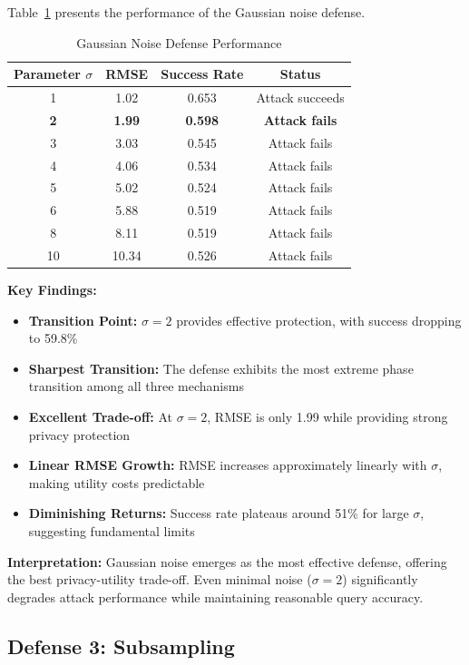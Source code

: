 \documentclass[11pt,letterpaper]{article}
\begin{document}
Table~\ref{tab:noise} presents the performance of the Gaussian noise defense.

\begin{table}[H]
\centering
\caption{Gaussian Noise Defense Performance}
\label{tab:noise}
\begin{tabular}{@{}cccc@{}}
\toprule
\textbf{Parameter $\sigma$} & \textbf{RMSE} & \textbf{Success Rate} & \textbf{Status} \\ \midrule
1 & 1.02 & 0.653 & Attack succeeds \\
\textbf{2} & \textbf{1.99} & \textbf{0.598} & \textbf{Attack fails} \\
3 & 3.03 & 0.545 & Attack fails \\
4 & 4.06 & 0.534 & Attack fails \\
5 & 5.02 & 0.524 & Attack fails \\
6 & 5.88 & 0.519 & Attack fails \\
8 & 8.11 & 0.519 & Attack fails \\
10 & 10.34 & 0.526 & Attack fails \\ \bottomrule
\end{tabular}
\end{table}

\textbf{Key Findings:}

\begin{itemize}[leftmargin=*]
    \item \textbf{Transition Point:} $\sigma = 2$ provides effective protection, with success dropping to 59.8\%
    \item \textbf{Sharpest Transition:} The defense exhibits the most extreme phase transition among all three mechanisms
    \item \textbf{Excellent Trade-off:} At $\sigma = 2$, RMSE is only 1.99 while providing strong privacy protection
    \item \textbf{Linear RMSE Growth:} RMSE increases approximately linearly with $\sigma$, making utility costs predictable
    \item \textbf{Diminishing Returns:} Success rate plateaus around 51\% for large $\sigma$, suggesting fundamental limits
\end{itemize}

\textbf{Interpretation:} Gaussian noise emerges as the most effective defense, offering the best privacy-utility trade-off. Even minimal noise ($\sigma = 2$) significantly degrades attack performance while maintaining reasonable query accuracy.

\subsection{Defense 3: Subsampling}
\end{document}
